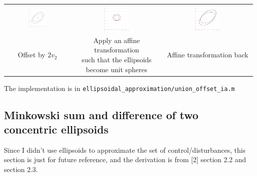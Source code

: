 \documentclass{article}
\begin{document}
\begin{table}[H]
\begin{tabular}{ccc}
		\includegraphics[width=0.3\textwidth]{union_offset_ia/6.pdf} & \includegraphics[width=0.3\textwidth]{union_offset_ia/7.pdf} & \includegraphics[width=0.3\textwidth]{union_offset_ia/8.pdf}\\
		Offset by $2v_2$ & \makecell{Apply an affine transformation \\such that the ellipsoids \\become unit spheres} & Affine transformation back
	\end{tabular}
	\label{union_offset_ia2}
\end{table}

The implementation is in \texttt{ellipsoidal\_approximation/union\_offset\_ia.m}

\subsection{Minkowski sum and difference of two concentric ellipsoids}
Since I didn't use ellipsoids to approximate the set of control/disturbances, this section is just for future reference, and the derivation is from [2] section 2.2 and section 2.3.
\end{document}

